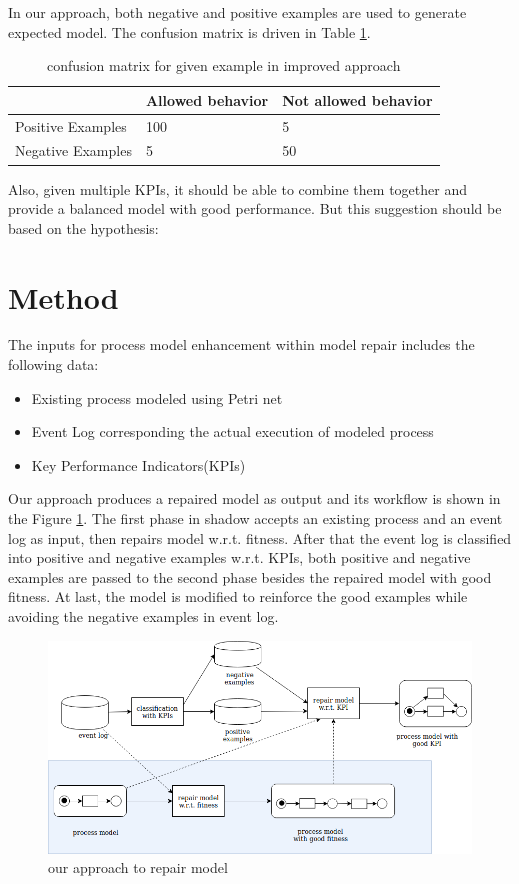 \documentclass[12pt, a4paper]{article}
\begin{document}


In our approach, both negative and positive examples are used to generate expected model. The confusion matrix is driven in Table \ref{table:cm_improved}. 
\begin{table}[h!]
	\centering
	\caption{confusion matrix for given example in improved approach}
	\label{table:cm_improved}
\begin{tabular}{|l|l|l|}
	
	\hline
	&	Allowed behavior & 	Not allowed behavior \\
	\hline
	Positive Examples  &	100 & 	5 \\	
	\hline
	Negative Examples    &	5 & 	50 \\	
	\hline
\end{tabular}
\end{table}


Also, given multiple KPIs, it should be able to combine them together and provide a balanced model with good performance. But this suggestion should be based on the hypothesis:
 
\section*{Method}
The inputs for process model enhancement within model repair includes the following data:
\begin{itemize}
	\item Existing process modeled using Petri net
	\item Event Log corresponding the actual execution of modeled process
	\item Key Performance Indicators(KPIs)
\end{itemize}
 Our approach produces a repaired model as output and its workflow is shown in the Figure \ref{fig:approach}. The first phase in shadow accepts an existing process and an event log as input, then repairs model w.r.t. fitness.  After that the event log is classified into positive and negative examples w.r.t. KPIs, both positive and negative examples are passed to the second phase besides the repaired model with good fitness. At last, the model is modified to reinforce the good examples while avoiding the negative examples in event log. 
\begin{figure}[h!]
	\includegraphics[width=\textwidth]{P04_approach.png}
	\caption{our approach to repair model}
	\label{fig:approach}
\end{figure}
\end{document}
